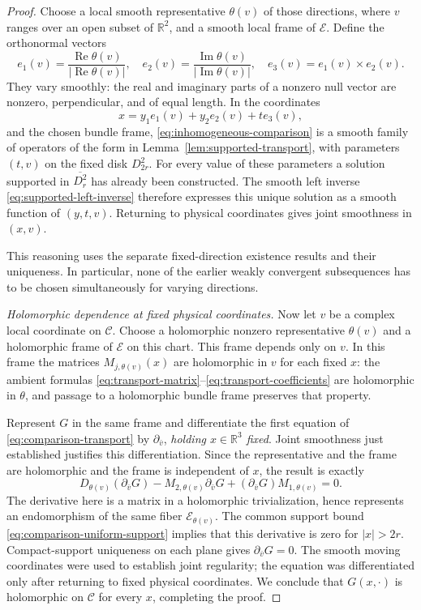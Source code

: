 \documentclass[11pt]{article}
\newcommand{\R}{\mathbb R}
\newcommand{\Ecal}{\mathcal E}
\theoremstyle{remark}
\numberwithin{equation}{section}
\begin{document}
\begin{proof}
Choose a local smooth representative $\theta(v)$ of those directions,
where $v$ ranges over an open subset of $\R^2$, and a smooth local
frame of $\Ecal$. Define the orthonormal vectors
\[
 e_1(v)=\frac{\operatorname{Re}\theta(v)}
                   {|\operatorname{Re}\theta(v)|},
 \quad
 e_2(v)=\frac{\operatorname{Im}\theta(v)}
                   {|\operatorname{Im}\theta(v)|},
 \quad
 e_3(v)=e_1(v)\times e_2(v).
\]
They vary smoothly: the real and imaginary parts of a nonzero null
vector are nonzero, perpendicular, and of equal length. In the
coordinates
\[
 x=y_1e_1(v)+y_2e_2(v)+te_3(v),
\]
and the chosen bundle frame, \eqref{eq:inhomogeneous-comparison}
is a smooth family of operators of the form in
Lemma~\ref{lem:supported-transport}, with parameters $(t,v)$ on
the fixed disk $D_{2r}^2$. For every value of these parameters a
solution supported in $\overline{D_r^2}$ has already been
constructed. The smooth left inverse
\eqref{eq:supported-left-inverse} therefore expresses this unique
solution as a smooth function of $(y,t,v)$. Returning to physical
coordinates gives joint smoothness in $(x,v)$.

This reasoning uses the separate fixed-direction existence results
and their uniqueness. In particular, none of the earlier weakly
convergent subsequences has to be chosen simultaneously for varying
directions.

\emph{Holomorphic dependence at fixed physical coordinates.}
Now let $v$ be a complex local coordinate on $\mathcal C$. Choose
a holomorphic nonzero representative $\theta(v)$ and a holomorphic
frame of $\Ecal$ on this chart. This frame depends only on $v$.
In this frame the matrices $M_{j,\theta(v)}(x)$ are holomorphic in
$v$ for each fixed $x$: the ambient formulas
\eqref{eq:transport-matrix}--\eqref{eq:transport-coefficients} are
holomorphic in $\theta$, and passage to a holomorphic bundle frame
preserves that property.

Represent $G$ in the same frame and differentiate the first equation
of \eqref{eq:comparison-transport} by $\partial_{\bar v}$,
\emph{holding $x\in\R^3$ fixed}. Joint smoothness just established
justifies this differentiation. Since the representative and the
frame are holomorphic and the frame is independent of $x$, the
result is exactly
\[
 D_{\theta(v)}(\partial_{\bar v}G)
  -M_{2,\theta(v)}\partial_{\bar v}G
  +(\partial_{\bar v}G)M_{1,\theta(v)}=0.
\]
The derivative here is a matrix in a holomorphic trivialization,
hence represents an endomorphism of the same fiber $\Ecal_{\theta(v)}$.
The common support bound \eqref{eq:comparison-uniform-support}
implies that this derivative is zero for $|x|>2r$. Compact-support
uniqueness on each plane gives $\partial_{\bar v}G=0$. The smooth
moving coordinates were used to establish joint regularity; the
equation was differentiated only after returning to fixed physical
coordinates. We conclude that $G(x,\cdot)$ is holomorphic on
$\mathcal C$ for every $x$, completing the proof.
\end{proof}
\end{document}
